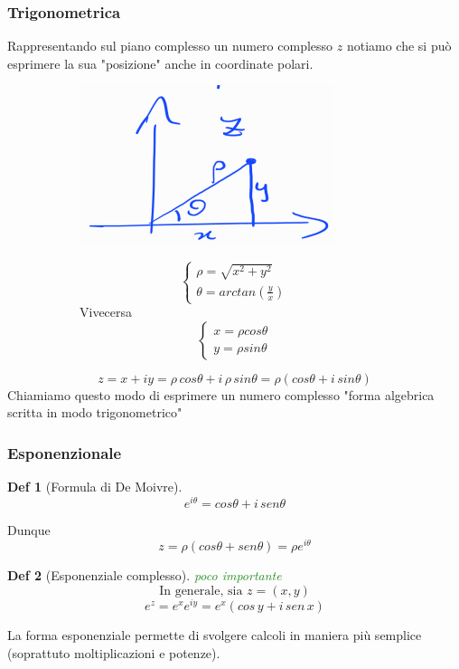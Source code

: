 \documentclass[a4paper]{article}
\newtheorem*{definition}{Def}
\newcommand{\appunto}[1]{\textcolor{ForestGreen}{#1}}
\begin{document}
\subsubsection{Trigonometrica}
Rappresentando sul piano complesso un numero complesso $z$ notiamo che si può esprimere la sua "posizione" anche in coordinate polari.\\
\begin{figure}[H]
	\begin{subfigure}[c]{0.5\textwidth}
	\includegraphics[width=\textwidth]{forma_trig.png}
	\end{subfigure}
	\begin{subfigure}[c]{0.5\textwidth}
		\begin{equation*}
			\begin{cases}
				\rho = \sqrt{x^2 +y^2}\\
				\theta = arctan(\frac{y}{x})
			\end{cases}
		\end{equation*}
		Vivecersa
		\begin{equation*}
			\begin{cases}
				x = \rho cos \theta\\
				y = \rho sin \theta
			\end{cases}
		\end{equation*}
	\end{subfigure}
\end{figure}
$$ z=x + iy = \rho\, cos \theta + i\,\rho \, sin \theta = \rho (cos\theta + i\,sin \theta)$$
Chiamiamo questo modo di esprimere un numero complesso "forma algebrica scritta in modo trigonometrico"

\subsubsection{Esponenzionale}
\begin{definition}[Formula di De Moivre]
	$$e^{i\theta} = cos\theta + i\, sen\theta$$
\end{definition}
Dunque
$$ z = \rho (cos \theta + sen \theta)=  \rho e^{i \theta}$$
\begin{definition}[Esponenziale complesso]\appunto{poco importante}\\
	$$\text{In generale, sia } z = (x,y)$$
	$$e^z = e^xe^{iy}=e^x(cos\,y + i \, sen\,x)$$
\end{definition}
La forma esponenziale permette di svolgere calcoli in maniera più semplice (soprattuto moltiplicazioni e potenze). 
\end{document}
